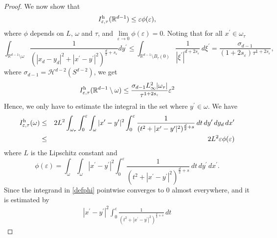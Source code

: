 \documentclass[11pt]{article}
\def\e{\varepsilon}
\begin{document}
\begin{proof}
We now show that 
\begin{equation}\label{stima-or}
I_{\e,\tau}^{\rm h}(\mathbb R^{d-1})\leq\e\phi(\e),
\end{equation}
where $\phi$ depends on $L$, $\omega$ and $\tau$, and $\lim\limits_{\e\to 0}\phi(\e)=0$.
Noting that for all $x^\prime\in\omega_\tau$ 
\begin{equation*}
\int_{\mathbb R^{d-1}\setminus\omega} \frac{1}{(|x_d-y_d|^2+|x^\prime-y^\prime|^2)^{\frac{d}{2}+s_\e}} dy^\prime
\leq\int_{\mathbb R^{d-1}\setminus B_\tau(0)} \frac{1}{|\xi^\prime|^{d+2s_\e}}\, d\xi^\prime
=\frac{\sigma_{d-1}}{(1+2s_\e)\tau^{1+2s_\e}}, 
\end{equation*}
where $\sigma_{d-1}=\mathcal H^{d-2}(S^{d-2})$, 
we get 
\begin{equation}
I^{\rm h}_{\e,\tau}(\mathbb R^{d-1}\setminus \omega)
\leq \frac{\sigma_{d-1}L^2_\infty |\omega_\tau|}{\tau^{1+2s_\e}}\e^2\label{st1}\\
\end{equation}
Hence, we only have to estimate the integral in the set where $y^\prime\in\omega$. 
We have 
\begin{eqnarray*}
I^{\rm h}_{\e,\tau}(\omega)
&\leq& 
2L^2\int_{\omega_\tau}\int_0^\e\int_{\omega}|x^\prime-y^\prime|^2\int_0^\e\frac{1}{(t^2+|x^\prime-y^\prime|^2)^{\frac{d}{2}+s}}\, dt\, dy^\prime\, dy_d\, dx^\prime\\
&\leq& 
2L^2\e\phi(\e)
\end{eqnarray*}
where $L$ is the Lipschitz constant and 
\begin{equation}\label{defphi}\phi(\e)=
\int_{\omega}\int_{\omega}|x^\prime-y^\prime|^2
\int_0^\e\frac{1}{(t^2+|x^\prime-y^\prime|^2)^{\frac{d}{2}+s}}\, dt
\, dy^\prime\, dx^\prime.
\end{equation}
Since the integrand in \eqref{defphi} pointwise converges to $0$ almost everywhere, and it is estimated by 
\begin{eqnarray*}
|x^\prime-y^\prime|^2\int_0^\e\frac{1}{(t^2+|x^\prime-y^\prime|^2)^{\frac{d}{2}+s}}\, dt

\end{eqnarray*}
\end{proof}
\end{document}
